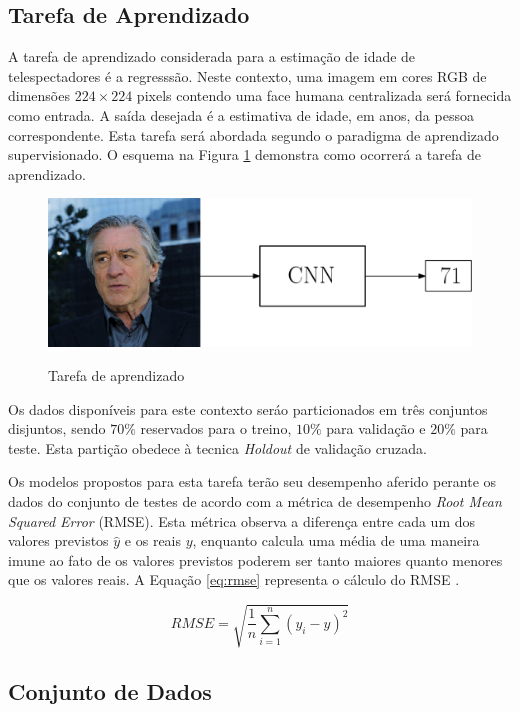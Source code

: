 
\subsection{Tarefa de Aprendizado}
A tarefa de aprendizado considerada para a estimação de idade de telespectadores é a regresssão. Neste contexto, uma imagem em cores RGB de dimensões $224 \times 224$ pixels contendo uma face humana centralizada será fornecida como entrada. A saída desejada é a estimativa de idade, em anos, da pessoa correspondente. Esta tarefa será abordada segundo o paradigma de aprendizado supervisionado. O esquema na Figura \ref{fig:deniro_cnn} demonstra como ocorrerá a tarefa de aprendizado.

\begin{figure}
     \caption{Tarefa de aprendizado}
     \includegraphics[width=\textwidth]{img/deniro_cnn}
     \label{fig:deniro_cnn}
\end{figure}

Os dados disponíveis para este contexto seráo particionados em três conjuntos disjuntos, sendo $70\%$ reservados para o treino, $10\%$ para validação e $20\%$ para teste. Esta partição obedece à tecnica \emph{Holdout} de validação cruzada.

Os modelos propostos para esta tarefa terão seu desempenho aferido perante os dados do conjunto de testes de acordo com a métrica de desempenho \emph{Root Mean Squared Error} (RMSE). Esta métrica observa a diferença entre cada um dos valores previstos $\hat{y}$ e os reais $y$, enquanto calcula uma média de uma maneira imune ao fato de os valores previstos poderem ser tanto maiores quanto menores que os valores reais. A Equação \ref{eq:rmse} representa o cálculo do RMSE \cite{brink2016real}.

\begin{equation}\label{eq:rmse}
     RMSE = \sqrt{\frac{1}{n} \sum_{i=1}^n (y_i - \hat{y})^2}
\end{equation}

\subsection{Conjunto de Dados}


